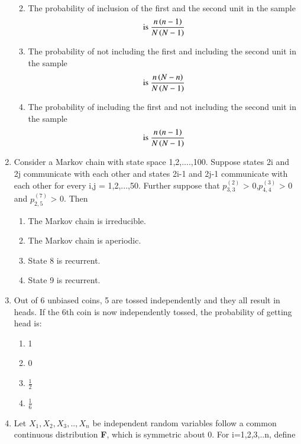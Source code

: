 \begin{enumerate}[label=\thesection.\arabic*.,ref=\thesection.\theenumi]
\begin{enumerate}
\begin{align}
    \end{align}
    \item The probability of inclusion of the first and the second unit in the sample
    \begin{align}
        \text{ is } \frac{n \left(n-1\right)}{N \left(N-1\right)}
    \end{align}
    \item The probability of not including the first and including the second unit in the sample
    \begin{align}
        \text{ is } \frac{n \left(N-n\right)}{N \left(N-1\right)}
    \end{align}
    \item The probability of including the first and not including the second unit in the sample
    \begin{align}
        \text{ is } \frac{n \left(n-1\right)}{N \left(N-1\right)}
    \end{align}
\end{enumerate}
%
\solution

%
\item Consider a Markov chain with state space {1,2,....,100}. Suppose states 2i and 2j communicate with each other and states 2i-1 and 2j-1 communicate with each other for every i,j = 1,2,...,50. Further suppose that $p^{(2)}_{3,3}$ > 0,$p^{(3)}_{4,4}$ > 0 and $p^{(7)}_{2,5}$ > 0. Then 
\begin{enumerate}
\item The Markov chain is irreducible.
\item The Markov chain is aperiodic.
\item State 8 is recurrent.
\item State 9 is recurrent.
\end{enumerate}
%
\solution

%
\item Out of 6 unbiased coins, 5 are tossed independently and they all result in heads. If the 6th coin is now independently tossed, the probability of getting head is:
\begin{enumerate}[label=(\alph*)]
\item 1
\item 0
\item $\frac{1}{2}$
\item $\frac{1}{6}$
\end{enumerate}
%
\solution

%
\item Let $X_{1},X_{2},X_{3},..,X_{n}$ be independent random variables follow a common continuous distribution \textbf{F}, which is symmetric about 0. For i=1,2,3,..n, define 

\end{enumerate}
